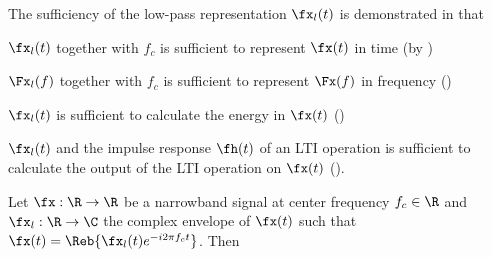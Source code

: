 The sufficiency of the low-pass representation $\fx_l(t)$
is demonstrated in that
\begin{enume}
   \item $\fx_l(t)$ together with $f_c$ is sufficient to represent
         $\fx(t)$ in time (by )
   \item $\Fx_l(f)$ together with $f_c$ is sufficient to represent
         $\Fx(f)$ in frequency ()
   \item $\fx_l(t)$ is sufficient to calculate the energy in $\fx(t)$
         ()
   \item $\fx_l(t)$ and the impulse response $\fh(t)$ of an LTI operation
         is sufficient to calculate the output of the LTI operation
         on $\fx(t)$ ().
\end{enume}
\begin{theorem}
\label{thm:xxl}
Let $\fx:\R\to\R$ be a narrowband signal at center frequency $f_c\in\R$
and $\fx_l:\R\to\C$ the complex envelope of $\fx(t)$ such that
  $\fx(t) = \Reb{\fx_l(t) e^{-i2\pi f_c t}}$.
Then
\end{theorem}
